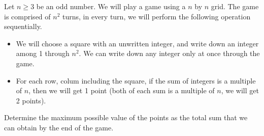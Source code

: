 Let $n\geq 3$ be an odd number. We will play a game using a $n$ by $n$ grid. The game is comprised of $n^2$ turns, in every turn, we will perform the following operation sequentially.

\begin{itemize}
	\item We will choose a square with an unwritten integer, and write down an integer among 1 through $n^2$. We can write down any integer only at once through the game.
	\item For each row, colum including the square, if the sum of integers is a multiple of $n$, then we will get 1 point (both of each sum is a multiple of $n$, we will get 2 points).
\end{itemize}

Determine the maximum possible value of the points as the total sum that we can obtain by the end of the game.
